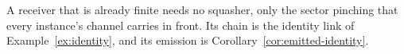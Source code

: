
A receiver that is already finite needs no squasher, only the sector
pinching that every instance's channel carries in front. Its chain is the
identity link of Example~\ref{ex:identity}, and its emission is
Corollary~\ref{cor:emitted-identity}.

